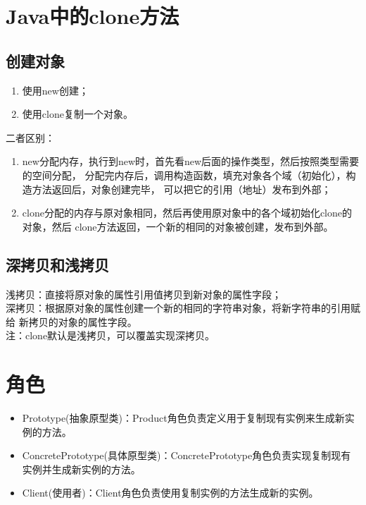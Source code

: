 \section{Java中的clone方法}
\subsection{创建对象}
\begin{enumerate}
	\item 使用new创建；
	\item 使用clone复制一个对象。
\end{enumerate}
二者区别：
\begin{enumerate}
	\item new分配内存，执行到new时，首先看new后面的操作类型，然后按照类型需要的空间分配，
	分配完内存后，调用构造函数，填充对象各个域（初始化），构造方法返回后，对象创建完毕，
	可以把它的引用（地址）发布到外部；
	\item clone分配的内存与原对象相同，然后再使用原对象中的各个域初始化clone的对象，然后
	clone方法返回，一个新的相同的对象被创建，发布到外部。
\end{enumerate}
\subsection{深拷贝和浅拷贝}
\noindent 浅拷贝：直接将原对象的属性引用值拷贝到新对象的属性字段；
\\ 深拷贝：根据原对象的属性创建一个新的相同的字符串对象，将新字符串的引用赋给
新拷贝的对象的属性字段。
\\ 注：clone默认是浅拷贝，可以覆盖实现深拷贝。
\section{角色}
\begin{itemize}
	\item Prototype(抽象原型类)：Product角色负责定义用于复制现有实例来生成新实例的方法。
	\item ConcretePrototype(具体原型类)：ConcretePrototype角色负责实现复制现有实例并生成新实例的方法。
	\item Client(使用者)：Client角色负责使用复制实例的方法生成新的实例。
\end{itemize}
